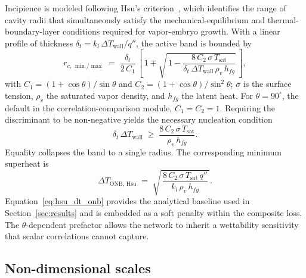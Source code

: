 Incipience is modeled following Hsu's criterion~\citep{hsu1962}, which
identifies the range of cavity radii that simultaneously satisfy the
mechanical-equilibrium and thermal-boundary-layer conditions required for
vapor-embryo growth. With a linear
profile of thickness $\delta_t = k_l\,\Delta T_{\mathrm{wall}}/q''$, the
active band is bounded by
%
\begin{equation}\label{eq:hsu_rc_range}
r_{c,\,\min/\max} \;=\;
\frac{\delta_t}{2\,C_1}\,
\left[\,1 \mp \sqrt{\,1 - \frac{8\,C_2\,\sigma\,T_{\mathrm{sat}}}{\delta_t\,\Delta T_{\mathrm{wall}}\,\rho_v\,h_{fg}}}\,\right],
\end{equation}
%
with $C_1 = (1+\cos\theta)/\sin\theta$ and
$C_2 = (1+\cos\theta)/\sin^{2}\theta$; $\sigma$ is the surface tension,
$\rho_v$ the saturated vapor density, and $h_{fg}$ the latent heat. For
$\theta = 90^{\circ}$, the default in the correlation-comparison module,
$C_1 = C_2 = 1$. Requiring the discriminant to be non-negative yields the
necessary nucleation condition
%
\begin{equation}\label{eq:hsu_discriminant}
\delta_t\,\Delta T_{\mathrm{wall}}
\;\ge\; \frac{8\,C_2\,\sigma\,T_{\mathrm{sat}}}{\rho_v\,h_{fg}}.
\end{equation}
%
Equality collapses the band to a single radius. The corresponding minimum
superheat is
%
\begin{equation}\label{eq:hsu_dt_onb}
\Delta T_{\mathrm{ONB,\,Hsu}}
\;=\; \sqrt{\,\frac{8\,C_2\,\sigma\,T_{\mathrm{sat}}\,q''}{k_l\,\rho_v\,h_{fg}}\,}.
\end{equation}
%
Equation~\eqref{eq:hsu_dt_onb} provides the analytical baseline used in
Section~\ref{sec:results} and is embedded as a soft penalty within the
composite loss. The $\theta$-dependent prefactor allows the network to
inherit a wettability sensitivity that scalar correlations cannot
capture.

\subsection{Non-dimensional scales}\label{subsec:nondim}%
\label{subsec:dimless}

